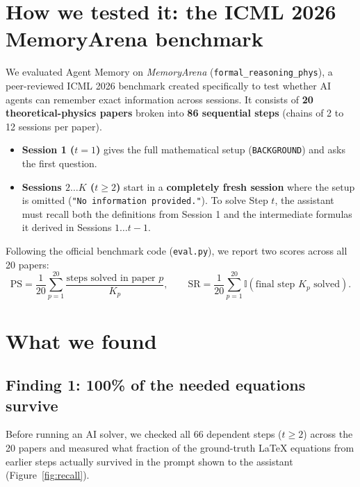 \documentclass[11pt,a4paper]{article}
\begin{document}
\section{How we tested it: the ICML 2026 MemoryArena benchmark}

We evaluated Agent Memory on \emph{MemoryArena} (\texttt{formal\_reasoning\_phys}), a peer-reviewed ICML 2026 benchmark created specifically to test whether AI agents can remember exact information across sessions. It consists of \textbf{20 theoretical-physics papers} broken into \textbf{86 sequential steps} (chains of 2 to 12 sessions per paper).
\begin{itemize}[itemsep=2pt,leftmargin=1.5em]
  \item \textbf{Session 1 ($t=1$)} gives the full mathematical setup (\texttt{BACKGROUND}) and asks the first question.
  \item \textbf{Sessions $2\dots K$ ($t \ge 2$)} start in a \textbf{completely fresh session} where the setup is omitted (\texttt{"No information provided."}). To solve Step $t$, the assistant must recall both the definitions from Session 1 and the intermediate formulas it derived in Sessions $1\dots t-1$.
\end{itemize}

Following the official benchmark code (\texttt{eval.py}), we report two scores across all 20 papers:
\[
  \text{PS} = \frac{1}{20}\sum_{p=1}^{20}\frac{\text{steps solved in paper } p}{K_p}, \qquad
  \text{SR} = \frac{1}{20}\sum_{p=1}^{20} \mathbb{I}(\text{final step } K_p\text{ solved}).
\]

\section{What we found}

\subsection*{Finding 1: 100\% of the needed equations survive}

Before running an AI solver, we checked all 66 dependent steps ($t \ge 2$) across the 20 papers and measured what fraction of the ground-truth LaTeX equations from earlier steps actually survived in the prompt shown to the assistant (Figure~\ref{fig:recall}).
\end{document}
